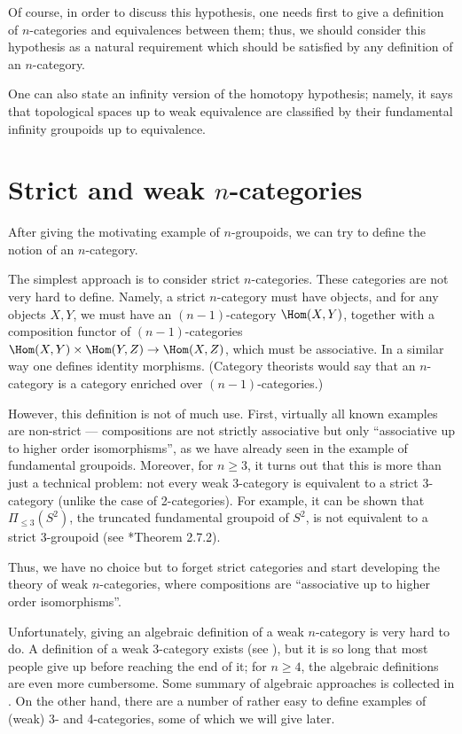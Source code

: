Of course, in order to discuss this hypothesis, one needs first to give a
definition of $n$-categories and equivalences between them; thus, we should
consider this hypothesis as a natural requirement which should be satisfied by
any definition of an $n$-category.

One can also state an infinity version of the homotopy hypothesis; namely, it
says that topological spaces up to weak equivalence are classified by their
fundamental infinity groupoids up to equivalence.

\section{Strict and weak $n$-categories}\label{s:strict-n-cat}
After giving the motivating example of $n$-groupoids, we can try to
define the notion of an $n$-category.

The simplest approach is to consider strict $n$-categories. These categories are
not very hard to define. Namely, a strict $n$-category must have objects, and
for any objects $X,Y$, we must have an $(n-1)$-category $\Hom (X,Y)$, together
with a composition functor of $(n-1)$-categories $\Hom(X,Y)\times \Hom(Y,Z)\to
\Hom(X,Z)$, which must be associative. In a similar way one defines identity
morphisms. (Category theorists would say that an
$n$-category is a category enriched over $(n-1)$-categories.)

However, this definition is not of much use. First, virtually all known examples
are non-strict --- compositions are not strictly associative but only
``associative up to higher order isomorphisms'', as we have already seen in the
example of fundamental groupoids. Moreover, for $n\ge 3$, it turns out that this
is more than just a technical problem: not every weak 3-category is equivalent
to a strict 3-category (unlike the case of 2-categories). For example, it can be
shown that $\Pi_{\leq 3}(S^2)$, the truncated fundamental
groupoid of $S^2$, is not equivalent to a strict 3-groupoid (see
*{Theorem 2.7.2}).



Thus, we have no choice but to forget strict categories and start developing the
theory of weak $n$-categories, where compositions are ``associative up to
higher order isomorphisms''.


Unfortunately, giving an algebraic definition of a weak $n$-category is very
hard to do. A definition of a weak 3-category exists (see
), but it is so long that most people give up before
reaching the end of it; for $n\ge 4$, the algebraic definitions are even more
cumbersome. Some summary of algebraic approaches is collected in
. On the other hand, there are a number of rather easy to
define examples of (weak) 3- and 4-categories, some of which we will give
later.


